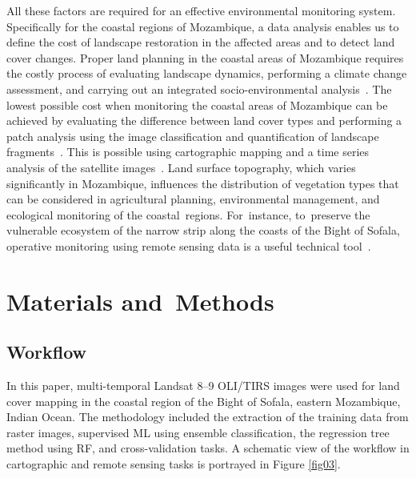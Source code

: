 \documentclass[coasts,article,accept,pdftex,oneauthor]{Definitions/mdpi}
\begin{document}
All these factors {are required for an effective} environmental monitoring system{. Specifically for }the coastal regions of Mozambique{, a data analysis enables us }to define the cost of landscape restoration in the affected areas and {to }{detect} land cover{ }changes.{ }{Proper land} planning in {the }coastal areas of Mozambique requires {the costly process of }evaluating {landscape }dynamics{, }{performing a climate change} {assessment}, and carrying out an {integrated} socio-environmental {analysis}~\cite{SMITH2019101976,LUNDGREN2022103023,SILVA201843,MARTINS2022102793}.{ The }lowest possible cost when {monitoring} the coastal areas of Mozambique {can} be achieved by evaluating the difference between{ }{land cover} types and performing a patch analysis using the image classification and quantification of landscape fragments~\cite{PITTMAN2023}. This is possible using cartographic mapping and a time series analysis of the satellite images~\cite{XI2019111212,ABIDI2023106152,MOHAMMADI2023272}. Land surface topography, which varies significantly in Mozambique, influences the distribution of vegetation types that can be considered in agricultural planning, environmental management, {and} ecological monitoring of the coastal~regions. For~instance, to~preserve{ }the vulnerable ecosystem of the narrow strip along the coasts of the Bight of Sofala, operative monitoring using remote sensing data {is }a useful technical tool~\cite{NAMAGANDA2023117811}. 

\section{Materials and~Methods}
\unskip

\subsection{Workflow}
In this paper, multi-temporal Landsat {8--9} OLI/TIRS images {were} used for land cover mapping in the coastal region of the Bight of Sofala, eastern Mozambique,{ }Indian Ocean. {The{ }methodology included the {extraction of the} training data from{ }raster images, supervised ML using ensemble classification{, }the regression tree method using RF, and cross-validation tasks}. {A schematic view of the workflow in cartographic and remote sensing {tasks} is portrayed in Figure} \ref{fig03}{.}
\end{document}
